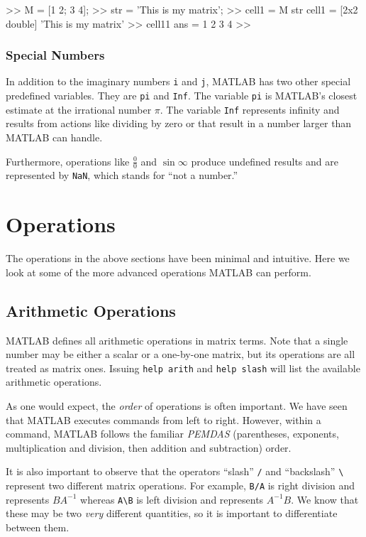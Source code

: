 \begin{codex}
>>  M = [1 2; 3 4];
>>  str = 'This is my matrix';
>>  cell1 = {M str}
cell1 =
    [2x2 double]    'This is my matrix'
>> cell1{1}
ans =
    1   2
    3   4
>>
\end{codex}

\subsubsection{Special Numbers}
In addition to the imaginary numbers \verb=i= and \verb=j=, MATLAB has two other special predefined variables.  They are \verb=pi= and \verb=Inf=.  The variable \verb=pi= is MATLAB's closest estimate at the irrational number $\pi$.  The variable \verb=Inf= represents infinity and results from actions like dividing by zero or that result in a number larger than MATLAB can handle.
\par
Furthermore, operations like $\frac{0}{0}$ and $\sin \infty$ produce undefined results and are represented by \verb=NaN=, which stands for ``not a number.''

\section{Operations}
The operations in the above sections have been minimal and intuitive.  Here we look at some of the more advanced operations MATLAB can perform.

\subsection{Arithmetic Operations} \label{sec.matlab.arithop}
MATLAB defines all arithmetic operations in matrix terms.  Note that a single number may be either a scalar or a one-by-one matrix, but its operations are all treated as matrix ones.  Issuing \verb=help arith= and \verb=help slash= will list the available arithmetic operations.
\par As one would expect, the \textit{order} of operations is often important. We have seen that MATLAB executes commands from left to right.  However, within a command, MATLAB follows the familiar \textit{PEMDAS} (parentheses, exponents, multiplication and division, then addition and subtraction) order.
\par
It is also important to observe that the operators ``slash'' \verb=/= and ``backslash'' \verb=\= represent two different matrix operations.  For example, \verb=B/A= is right division and represents $BA^{-1}$ whereas \verb=A\B= is left division and represents $A^{-1}B$.  We know that these may be two \textit{very} different quantities, so it is important to differentiate between them.

